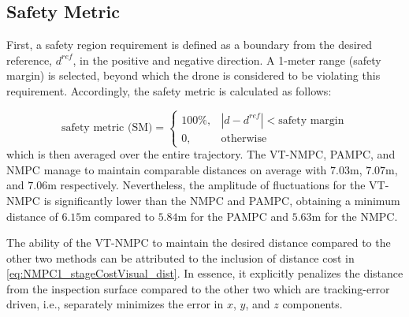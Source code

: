 % 








\subsection{Safety Metric}

First, a safety region requirement is defined as a boundary from the desired reference, $d^{ref}$, in the positive and negative direction. A 1-meter range (safety margin) is selected, beyond which the drone is considered to be violating this requirement. Accordingly, the safety metric is calculated as follows:

\begin{equation}
    \text{safety metric (SM)} = 
    \begin{cases}
      100\%, &   |d - d^{ref}| < \text{safety margin}\\
      0, & \text{otherwise}
    \end{cases}
    \label{eq:safety}
\end{equation}
which is then averaged over the entire trajectory. 
 The VT-NMPC, PAMPC, and NMPC manage to maintain comparable distances on average with $7.03$m, $7.07$m, and $7.06$m respectively. Nevertheless, the amplitude of fluctuations for the VT-NMPC is significantly lower than the NMPC and PAMPC, obtaining a minimum distance of $6.15$m compared to $5.84$m for the PAMPC and $5.63$m for the NMPC.

 The ability of the VT-NMPC to maintain the desired distance compared to the other two methods can be attributed to the inclusion of distance cost in \eqref{eq:NMPC1_stageCostVisual_dist}.  In essence, it explicitly penalizes the distance from the inspection surface compared to the other two which are tracking-error driven, i.e., separately minimizes the error in $x$, $y$, and $z$ components.




